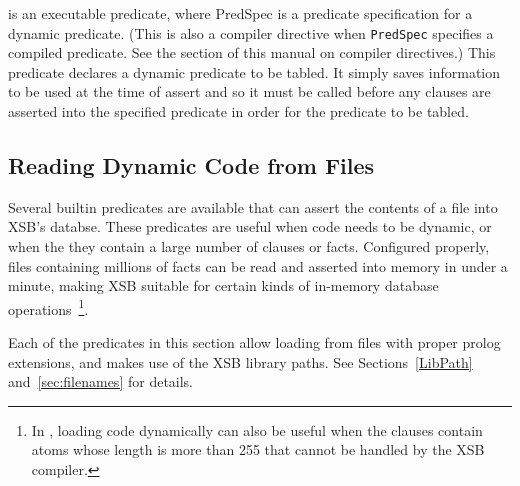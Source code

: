 \begin{description}
is an executable predicate, where PredSpec is a predicate
specification for a dynamic predicate. (This is also a compiler
directive when {\tt PredSpec} specifies a compiled predicate. See the
section of this manual on compiler directives.) This predicate
declares a dynamic predicate to be tabled. It simply saves information
to be used at the time of assert and so it must be called before any
clauses are asserted into the specified predicate in order for the
predicate to be tabled.

\end{description}

\subsection{Reading Dynamic Code from Files} \label{sec:LoadDyn}

Several builtin predicates are available that can assert the contents
of a file into XSB's databse.  These predicates are useful when code
needs to be dynamic, or when the they contain a large number of
clauses or facts.  Configured properly, files containing millions of
facts can be read and asserted into memory in under a minute, making
XSB suitable for certain kinds of in-memory database
operations~\footnote{In \version{}, loading code dynamically can also
be useful when the clauses contain atoms whose length is more than 255
that cannot be handled by the XSB compiler.}.  

Each of the predicates in this section allow loading from files with
proper prolog extensions, and makes use of the XSB library paths.  See
Sections~\ref{LibPath} and~\ref{sec:filenames} for details.

